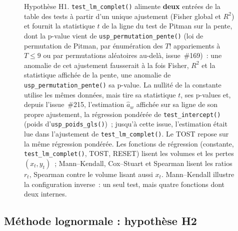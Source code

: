 \documentclass[a4paper,11pt]{article}
\newcommand{\code}[1]{\texttt{\small #1}}
\begin{document}
\begin{figure}[H]
\caption{Hypothèse H1. \code{test\_lm\_complet()} alimente \textbf{deux}
entrées de la table des tests à partir d'un unique ajustement (Fisher global et $R^2$)
et fournit la statistique $t$ de la ligne du test de Pitman sur la pente, dont la
p-value vient de \code{usp\_permutation\_pente()} (loi de permutation de Pitman, par
énumération des $T!$ appariements à $T \le 9$ ou par permutations aléatoires au-delà,
issue~\#169)~: une anomalie de cet ajustement fausserait à la fois Fisher, $R^2$ et la
statistique affichée de la pente, une anomalie de \code{usp\_permutation\_pente()} sa p-value. La nullité de la constante utilise les mêmes données,
mais tire sa statistique $t$, ses p-values et, depuis l'issue~\#215, l'estimation $\hat a_w$
affichée sur sa ligne de son propre ajustement, la régression pondérée de
\code{test\_intercept()} (poids d'\code{usp\_poids\_gls()})~; jusqu'à cette issue, l'estimation
était lue dans l'ajustement de \code{test\_lm\_complet()}. Le TOST repose sur la même régression
pondérée. Les fonctions de régression
(constante, \code{test\_lm\_complet()}, TOST, RESET) lisent les volumes et les pertes
$(x_t, y_t)$~; Mann--Kendall, Cox--Stuart et Spearman lisent les ratios $r_t$, Spearman contre
le volume lisant aussi $x_t$. Mann--Kendall
illustre la configuration inverse~: un seul test, mais quatre fonctions dont
deux internes.}
\label{fig:annexe-h1}
\end{figure}

\subsection{Méthode lognormale : hypothèse H2}
\end{document}
